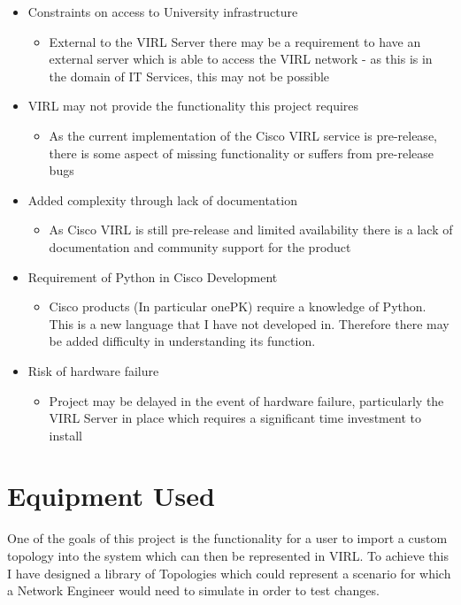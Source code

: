 \documentclass[11pt]{report}
\begin{document}
\begin{itemize}
  \item{Constraints on access to University infrastructure}
  \begin{itemize}
    \item{External to the VIRL Server there may be a requirement to have an external server which is able to access the VIRL network - as this is in the domain of IT Services, this may not be possible}
  \end{itemize}
  \item{VIRL may not provide the functionality this project requires}
  \begin{itemize}
    \item{As the current implementation of the Cisco VIRL service is pre-release, there is some aspect of missing functionality or suffers from pre-release bugs}
  \end{itemize}
  \item{Added complexity through lack of documentation}
  \begin{itemize}
    \item{As Cisco VIRL is still pre-release and limited availability there is a lack of documentation and community support for the product}
  \end{itemize}
  \item{Requirement of Python in Cisco Development}
  \begin{itemize}
    \item{Cisco products (In particular onePK) require a knowledge of Python. This is a new language that I have not developed in. Therefore there may be added difficulty in understanding its function.}
  \end{itemize}
  \item{Risk of hardware failure}
  \begin{itemize}
    \item{Project may be delayed in the event of hardware failure, particularly the VIRL Server in place which requires a significant time investment to install}
  \end{itemize}
\end{itemize}

\section{Equipment Used}

One of the goals of this project is the functionality for a user to import a custom topology into the system which can then be represented in VIRL. To achieve this I have designed a library of Topologies which could represent a scenario for which a Network Engineer would need to simulate in order to test changes. 
\end{document}
